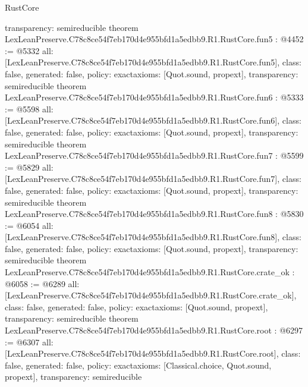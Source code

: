 \begin{lexlean}{RustCore}
\begin{coremodule}
{  transparency: semireducible
}
theorem LexLeanPreserve.C78c8ce54f7eb170d4e955bfd1a5edbb9.R1.RustCore.fun5 : @4452 := @5332 {
  all: [LexLeanPreserve.C78c8ce54f7eb170d4e955bfd1a5edbb9.R1.RustCore.fun5],
  class: false,
  generated: false,
  policy: exact{axioms: [Quot.sound, propext]},
  transparency: semireducible
}
theorem LexLeanPreserve.C78c8ce54f7eb170d4e955bfd1a5edbb9.R1.RustCore.fun6 : @5333 := @5598 {
  all: [LexLeanPreserve.C78c8ce54f7eb170d4e955bfd1a5edbb9.R1.RustCore.fun6],
  class: false,
  generated: false,
  policy: exact{axioms: [Quot.sound, propext]},
  transparency: semireducible
}
theorem LexLeanPreserve.C78c8ce54f7eb170d4e955bfd1a5edbb9.R1.RustCore.fun7 : @5599 := @5829 {
  all: [LexLeanPreserve.C78c8ce54f7eb170d4e955bfd1a5edbb9.R1.RustCore.fun7],
  class: false,
  generated: false,
  policy: exact{axioms: [Quot.sound, propext]},
  transparency: semireducible
}
theorem LexLeanPreserve.C78c8ce54f7eb170d4e955bfd1a5edbb9.R1.RustCore.fun8 : @5830 := @6054 {
  all: [LexLeanPreserve.C78c8ce54f7eb170d4e955bfd1a5edbb9.R1.RustCore.fun8],
  class: false,
  generated: false,
  policy: exact{axioms: [Quot.sound, propext]},
  transparency: semireducible
}
theorem LexLeanPreserve.C78c8ce54f7eb170d4e955bfd1a5edbb9.R1.RustCore.crate_ok : @6058 := @6289 {
  all: [LexLeanPreserve.C78c8ce54f7eb170d4e955bfd1a5edbb9.R1.RustCore.crate_ok],
  class: false,
  generated: false,
  policy: exact{axioms: [Quot.sound, propext]},
  transparency: semireducible
}
theorem LexLeanPreserve.C78c8ce54f7eb170d4e955bfd1a5edbb9.R1.RustCore.root : @6297 := @6307 {
  all: [LexLeanPreserve.C78c8ce54f7eb170d4e955bfd1a5edbb9.R1.RustCore.root],
  class: false,
  generated: false,
  policy: exact{axioms: [Classical.choice, Quot.sound, propext]},
  transparency: semireducible
}


\end{coremodule}
\end{lexlean}
